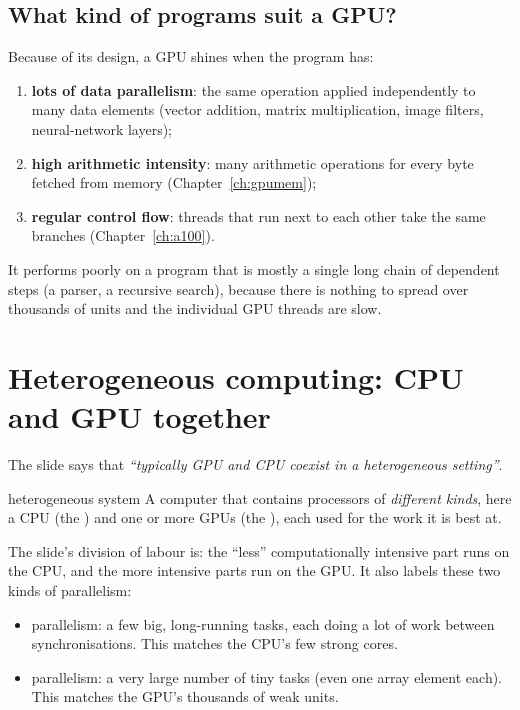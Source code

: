\subsection{What kind of programs suit a GPU?}

Because of its design, a GPU shines when the program has:
\begin{enumerate}
  \item \textbf{lots of data parallelism}: the same operation applied independently to many data elements
        (vector addition, matrix multiplication, image filters, neural-network layers);
  \item \textbf{high arithmetic intensity}: many arithmetic operations for every byte fetched from memory (Chapter~\ref{ch:gpumem});
  \item \textbf{regular control flow}: threads that run next to each other take the same branches (Chapter~\ref{ch:a100}).
\end{enumerate}
It performs poorly on a program that is mostly a single long chain of dependent steps (a
parser, a recursive search), because there is nothing to spread over thousands of units and the
individual GPU threads are slow.

\section{Heterogeneous computing: CPU and GPU together}


The slide says that \emph{``typically GPU and CPU coexist in a heterogeneous setting''}.
\begin{definition}{heterogeneous system}
A computer that contains processors of \emph{different kinds}, here a CPU (the ) and
one or more GPUs (the ), each used for the work it is best at.
\end{definition}

The slide's division of labour is: the ``less'' computationally intensive part runs on the CPU, and the more intensive parts run on the GPU.
It also labels these two kinds of parallelism:
\begin{itemize}
  \item {} parallelism: a few big, long-running tasks, each doing a lot of work between synchronisations. This matches the CPU's few strong cores.
  \item {} parallelism: a very large number of tiny tasks (even one array element each). This matches the GPU's thousands of weak units.
\end{itemize}

